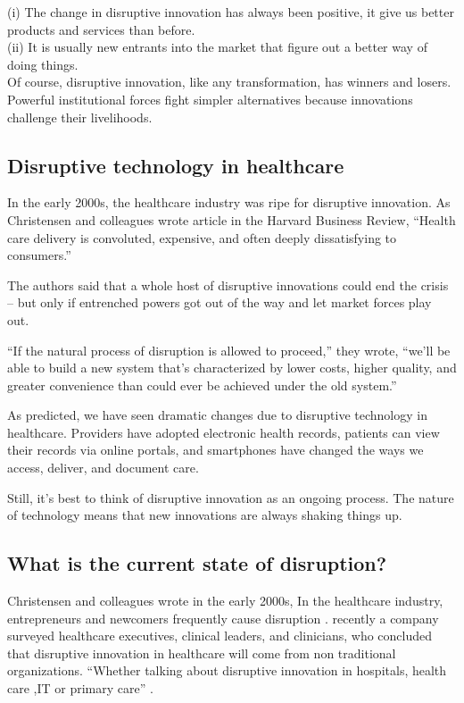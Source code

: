 \documentclass[12pt]{article}
\begin{document}
     \>(i) The change in disruptive innovation has always been positive, it give us better products and services than before.\\
     
(ii) It is usually new entrants into the market that figure out a better way of doing things.\\

Of course, disruptive innovation, like any transformation, has winners and losers. Powerful institutional forces fight simpler alternatives because innovations challenge their livelihoods.
\subsection{Disruptive technology in healthcare}
In the early 2000s, the healthcare industry was ripe for disruptive innovation. As Christensen and colleagues wrote article in the Harvard Business Review, “Health care delivery is convoluted, expensive, and often deeply dissatisfying to consumers.”

The authors said that a whole host of disruptive innovations could end the crisis – but only if entrenched powers got out of the way and let market forces play out.

“If the natural process of disruption is allowed to proceed,” they wrote, “we’ll be able to build a new system that’s characterized by lower costs, higher quality, and greater convenience than could ever be achieved under the old system.”

As predicted, we have seen dramatic changes due to disruptive technology in healthcare. Providers have adopted electronic health records, patients can view their records via online portals, and smartphones have changed the ways we access, deliver, and document care.

Still, it’s best to think of disruptive innovation as an ongoing process. The nature of technology means that new innovations are always shaking things up.

\subsection{What is the current state of disruption?}
Christensen and colleagues wrote in the early 2000s, In the healthcare industry, entrepreneurs and newcomers frequently cause  disruption .  recently a company surveyed healthcare executives, clinical leaders, and clinicians, who concluded that disruptive innovation in healthcare will come from non traditional organizations. “Whether talking about disruptive innovation in hospitals, health care ,IT or primary care” .
\end{document}
